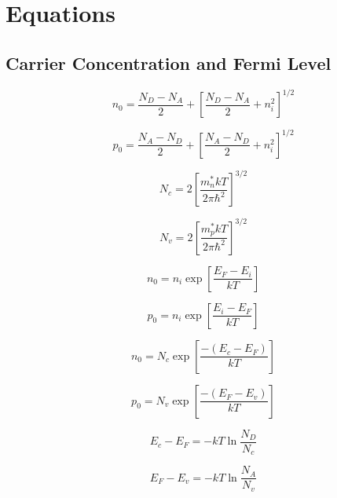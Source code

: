\documentclass{infosheet}
\begin{document}
\section{Equations}

\subsection{Carrier Concentration and Fermi Level}

\begin{displaymath}
  n_0 = \frac{N_D-N_A}{2} + \left[\frac{N_D-N_A}{2}+n_i^2\right]^{1/2}
\end{displaymath}

\begin{displaymath}
  p_0 = \frac{N_A-N_D}{2} + \left[\frac{N_A-N_D}{2}+n_i^2\right]^{1/2}
\end{displaymath}

\begin{multicols}{2}
  \begin{displaymath}
    N_c = 2\left[\frac{m_n^*kT}{2\pi\hbar^2}\right]^{3/2}
  \end{displaymath}
  
  \begin{displaymath}
    N_v = 2\left[\frac{m_p^*kT}{2\pi\hbar^2}\right]^{3/2}
  \end{displaymath}
\end{multicols}

\begin{multicols}{2}
  \begin{displaymath}
    n_0 = n_i\exp\left[\frac{E_F-E_i}{kT}\right]
  \end{displaymath}
  
  \begin{displaymath}
    p_0 = n_i\exp\left[\frac{E_i-E_F}{kT}\right]
  \end{displaymath}
\end{multicols}

\begin{multicols}{2}
  \begin{displaymath}
    n_0 = N_c\exp\left[\frac{-(E_c-E_F)}{kT}\right]
  \end{displaymath}
  
  \begin{displaymath}
    p_0 = N_v\exp\left[\frac{-(E_F-E_v)}{kT}\right]
  \end{displaymath}
\end{multicols}

\begin{multicols}{2}
  \begin{displaymath}
    E_c-E_F = -kT\ln\frac{N_D}{N_c}
  \end{displaymath}
  
  \begin{displaymath}
    E_F-E_v = -kT\ln\frac{N_A}{N_v}
  \end{displaymath}
\end{multicols}
\end{document}
